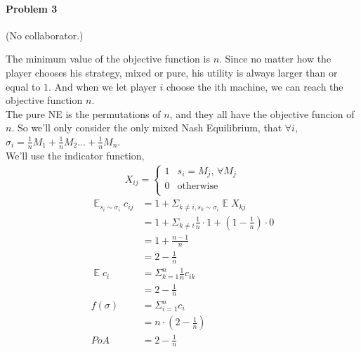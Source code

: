 \documentclass[12pt]{article}
\DeclareMathOperator*{\Expect}{\mathbb{E}}
\begin{document}
\bigskip

\paragraph{Problem 3} (No collaborator.)

The minimum value of the objective function is $n$.
Since no matter how the player chooses his strategy, 
mixed or pure, his utility is always larger than or equal to $1$.
And when we let player $i$ choose the ith machine, we can reach the objective function $n$.\\
The pure NE is the permutations of $n$, and they all have the objective funcion of $n$.
So we'll only consider the only mixed Nash Equilibrium,
that $\forall i$, $\sigma_i = \frac{1}{n}M_1 + \frac{1}{n}M_2 \ldots + \frac{1}{n}M_n$.\\
We'll use the indicator function,
\begin{align*}
X_{ij} = 
\begin{cases}
            1 &\mbox{$s_i = M_j$, $\forall M_j$} \\
            0 &\mbox{otherwise} \\
         \end{cases}
\end{align*}
\begin{align*}
\Expect_{s_i \sim \sigma_i} c_{ij} 
    &= 1 + \Sigma_{k \neq i, s_k \sim \sigma_i}\Expect X_{kj} \\
    &= 1 + \Sigma_{k \neq i}\frac{1}{n} \cdot 1 + (1 - \frac{1}{n}) \cdot 0\\
    &= 1 + \frac{n - 1}{n} \\
    &= 2 - \frac{1}{n} \\
\Expect c_i &= \Sigma_{k = 1}^n \frac{1}{n}c_{ik} \\
            &= 2 - \frac{1}{n}\\
f(\sigma) &= \Sigma_{i = 1}^n c_i \\
          &= n \cdot (2 - \frac{1}{n}) \\
PoA &=  2 - \frac{1}{n}
\end{align*}





\begin{thebibliography}{99}



\end{thebibliography}
\end{document}
